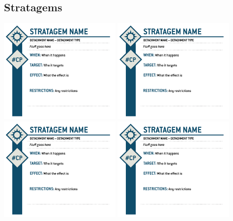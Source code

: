 \documentclass{report}
\begin{document}
\begin{multicols}{2}
\begin{minipage}[t][23.5cm][b]{\textwidth}
\section{Stratagems}\label{sec:strats}
\includegraphics[width =0.45\textwidth]{Images/Stratagems/Stratagem_1.png}
\includegraphics[width =0.45\textwidth]{Images/Stratagems/Stratagem_2.png}
\includegraphics[width =0.45\textwidth]{Images/Stratagems/Stratagem_3.png}
\includegraphics[width =0.45\textwidth]{Images/Stratagems/Stratagem_4.png}

\end{minipage}
\end{multicols}
\end{document}
